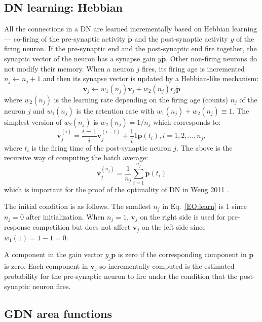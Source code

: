 \documentclass[conference]{IEEEtran}
\def\p{\mathbf p}
\def\v{\mathbf v}
\begin{document}
\subsection{DN learning: Hebbian}
  
All the connections in a DN are learned incrementally 
based on Hebbian learning --- co-firing of the pre-synaptic activity $\dot{\p}$ and the
post-synaptic activity $y$ of the firing neuron.   If the pre-synaptic end and the post-synaptic
end fire together, the synaptic vector of the neuron has a synapse gain $y\dot{\p}$.  
Other non-firing neurons do not modify their memory.   
When a neuron $j$ fires, its firing age is incremented $n_j \leftarrow n_j+1$ and then
its synapse vector is updated by a Hebbian-like mechanism:  
\begin{equation}
\v_j \leftarrow w_1(n_j) \v_j + w_2(n_j) r_j \dot{\p}
\label{EQ:learn}
\end{equation}
where $w_2 (n_j)$ is the learning rate depending on the firing age (counts) $n_j $ of the neuron $j$ and $w_1(n_j)$ is the retention rate with $w_1(n_j) + w_2(n_j) \equiv 1$. 
The simplest version of $w_2(n_j)$ is $w_2(n_j) = 1/ n_j$ which corresponds to:
\begin{equation}
 \v_j ^{(i)} = \frac{i-1}{i} \v_j^{(i-1)} + \frac{1}{i} 1 \dot{\p}(t_{i}), i = 1, 2, ... , n_j, \nonumber
\end{equation}
 where $t_i$ is the firing time of the post-synaptic neuron $j$. 
The above is the recursive way of computing the batch average:
\begin{equation}
 \v_j ^{(n_j)} = \frac{1}{n_j} \sum_{i=1}^{n_j} \dot{\p}(t_i) \nonumber
\label{EQ:sum} 
 \end{equation}
 which is important for the proof of the optimality of DN in Weng 2011 \cite{Weng3ThmRpt11}.
 
 The initial condition is as follows.   The smallest $n_j$ in Eq.~\eqref{EQ:learn}
   is 1 since $n_j=0$ after initialization.  When $n_j=1$, $\v_j$ on the right side is used for pre-response 
competition but does not affect $\v_j$ on the left side since $w_1(1) = 1-1=0$.

A component in the gain vector $y_j \dot{\p}$ is zero if the corresponding component in $\dot{\p}$ is zero.  Each 
component in $\v_j$ so incrementally computed is the estimated probability for the pre-synaptic neuron  
to fire under the condition that the post-synaptic neuron fires.  

\subsection{GDN area functions}
\end{document}
